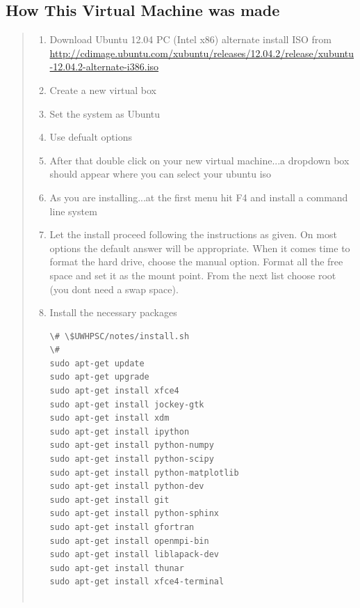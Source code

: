 \documentclass[letterpaper,10pt,english]{sphinxmanual}
\begin{document}
\subsection{How This Virtual Machine was made}
\label{vm:how-this-virtual-machine-was-made}\begin{quote}
\begin{enumerate}
\item {} 
Download Ubuntu 12.04 PC (Intel x86) alternate install ISO from
\href{http://cdimage.ubuntu.com/xubuntu/releases/12.04.2/release/xubuntu-12.04.2-alternate-i386.iso}{http://cdimage.ubuntu.com/xubuntu/releases/12.04.2/release/xubuntu-12.04.2-alternate-i386.iso}

\item {} 
Create a new virtual box

\item {} 
Set the system as Ubuntu

\item {} 
Use defualt options

\item {} 
After that double click on your new virtual machine...a dropdown
box should appear where you can select
your ubuntu iso

\item {} 
As you are installing...at the first menu hit F4 and install a
command line system

\item {} 
Let the install proceed following the instructions as given. On most
options the default answer will be appropriate.
When it comes time to format the hard drive, choose the manual option.
Format all the free space and set it as the mount
point. From the next list choose root (you dont need a swap space).

\item {} 
Install the necessary packages

\begin{Verbatim}[commandchars=\\\{\}]
\# \$UWHPSC/notes/install.sh
\# 
sudo apt-get update
sudo apt-get upgrade
sudo apt-get install xfce4
sudo apt-get install jockey-gtk
sudo apt-get install xdm
sudo apt-get install ipython
sudo apt-get install python-numpy
sudo apt-get install python-scipy
sudo apt-get install python-matplotlib
sudo apt-get install python-dev
sudo apt-get install git
sudo apt-get install python-sphinx
sudo apt-get install gfortran
sudo apt-get install openmpi-bin
sudo apt-get install liblapack-dev
sudo apt-get install thunar
sudo apt-get install xfce4-terminal


\end{Verbatim}
\end{enumerate}
\end{quote}
\end{document}
